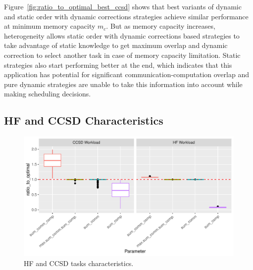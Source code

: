 \documentclass[sigconf]{acmart}
\begin{document}
{		Figure~\ref{fig:ratio_to_optimal_best_ccsd} shows that best variants of dynamic and static order with dynamic corrections strategies achieve similar performance at minimum memory capacity $m_c$. But as memory capacity increases, heterogeneity allows static order with dynamic corrections based strategies to take advantage of static knowledge to get maximum overlap and dynamic correction to select another task in case of memory capacity limitation. Static strategies also start performing better at the end, which indicates that this application has potential for significant communication-computation overlap and pure dynamic strategies are unable to take this information into account while making scheduling decisions.
		
		\subsection{HF and CCSD Characteristics}
		
		
		\begin{figure}[htb]
			\includegraphics[scale=0.5]{./results/plots/application_properties.pdf}
			\caption{HF and CCSD tasks characteristics.}
			\label{fig:ApplicationProperties}
		\end{figure}	
		
}
\end{document}
